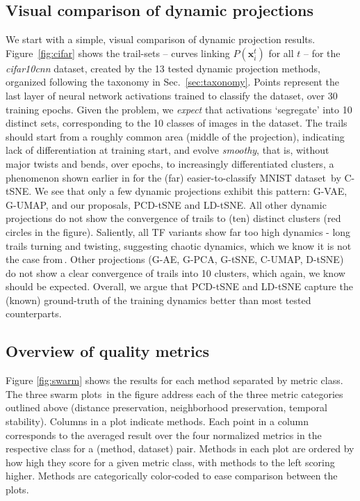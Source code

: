 \subsection{Visual comparison of dynamic projections}
\label{sec:visual_comp}
%
We start with a simple, visual comparison of dynamic projection results. Figure~\ref{fig:cifar} shows the trail-sets -- curves linking $P(\mathbf{x}_i^t)$ for all $t$ -- for the \emph{cifar10cnn} dataset, created by the 13 tested dynamic projection methods, organized following the taxonomy in Sec.~\ref{sec:taxonomy}. Points represent the last layer of neural network activations trained to classify the dataset, over 30 training epochs. Given the problem, we \emph{expect} that activations `segregate' into 10 distinct sets, corresponding to the 10 classes of images in the dataset. The trails should start from a roughly common area (middle of the projection), indicating lack of differentiation at training start, and evolve \emph{smoothy}, that is, without major twists and bends, over epochs, to increasingly differentiated clusters, a phenomenon shown earlier in for the (far) easier-to-classify MNIST dataset\,\citep{Rauber2017} by C-tSNE. We see that only a few dynamic projections exhibit this pattern: G-VAE, G-UMAP, and our proposals, PCD-tSNE and LD-tSNE. All other dynamic projections do not show the convergence of trails to (ten) distinct clusters (red circles in the figure). Saliently, all TF variants show far too high dynamics - long trails turning and twisting, suggesting chaotic dynamics, which we know it is not the case from\,\cite{Rauber2017}. Other projections (G-AE, G-PCA, G-tSNE, C-UMAP, D-tSNE) do not show a clear convergence of trails into 10 clusters, which again, we know should be expected. Overall, we argue that PCD-tSNE and LD-tSNE capture the (known) ground-truth of the training dynamics better than most tested counterparts.

\subsection{Overview of quality metrics}
%
Figure \ref{fig:swarm} shows the results for each method separated by metric class. The three swarm plots\,\citep{swarm} in the figure address each of the three metric categories outlined above (distance preservation, neighborhood preservation, temporal stability). Columns in a plot indicate methods. Each point in a column corresponds to the averaged result over the four normalized metrics in the respective class for a (method, dataset) pair. Methods in each plot are ordered by how high they score for a given metric class, with methods to the left scoring higher. Methods are categorically color-coded to ease comparison between the plots.

